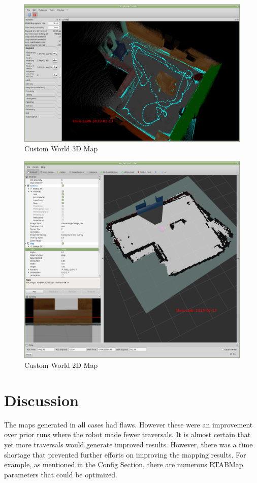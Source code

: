 \documentclass[10pt,journal,compsoc]{IEEEtran}
\begin{document}
\begin{figure}[h]
      \centering
      \includegraphics[width=\linewidth]{Assets/RTabViewMap_Custom.png}
      \caption{Custom World 3D Map}
      \label{fig:customworld_Map_3D}
\end{figure}

\begin{figure}[h]
      \centering
      \includegraphics[width=\linewidth]{Assets/rviz_custom_map.png}
      \caption{Custom World 2D Map}
      \label{fig:customworld_Map_2D}
\end{figure}



\section{Discussion}
The maps generated in all cases had flaws. However these were an improvement over prior runs where the robot made fewer traversals. It is almost certain that yet more traversals would generate improved results. However, there was a time shortage that prevented further efforts on improving the mapping results. For example, as mentioned in the Config Section, there are numerous RTABMap parameters that could be optimized.
\end{document}
